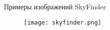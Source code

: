 
\begin{frame}{Примеры изображений SkyFinder}
\begin{figure}
\centering
\texttt{[image: skyfinder.png]}
\end{figure}
\end{frame}